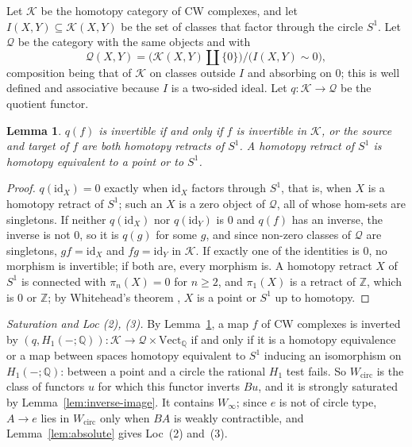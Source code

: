 \documentclass[11pt,a4paper]{article}
\newtheorem{lemma}[theorem]{Lemma}
\theoremstyle{definition}
\newcommand{\Winf}{W_{\infty}}
\newcommand{\Wcirc}{W_{\mathrm{circ}}}
\newcommand{\Z}{\mathbb{Z}}
\newcommand{\Q}{\mathbb{Q}}
\newcommand{\id}{\mathrm{id}}
\begin{document}
Let $\mathcal K$ be the homotopy category of CW complexes, and let $I(X,Y)\subseteq\mathcal
K(X,Y)$ be the set of classes that factor through the circle $S^1$. Let $\mathcal Q$ be the
category with the same objects and with
\[
\mathcal Q(X,Y)=\bigl(\mathcal K(X,Y)\amalg\{0\}\bigr)\big/\bigl(I(X,Y)\sim 0\bigr),
\]
composition being that of $\mathcal K$ on classes outside $I$ and absorbing on $0$; this is
well defined and associative because $I$ is a two-sided ideal. Let $q\colon\mathcal K\to\mathcal
Q$ be the quotient functor.

\begin{lemma}\label{lem:quotient}
$q(f)$ is invertible if and only if $f$ is invertible in $\mathcal K$, or the source and target
of $f$ are both homotopy retracts of $S^1$. A homotopy retract of $S^1$ is homotopy equivalent
to a point or to $S^1$.
\end{lemma}

\begin{proof}
$q(\id_X)=0$ exactly when $\id_X$ factors through $S^1$, that is, when $X$ is a homotopy
retract of $S^1$; such an $X$ is a zero object of $\mathcal Q$, all of whose hom-sets are
singletons. If neither $q(\id_X)$ nor $q(\id_Y)$ is $0$ and $q(f)$ has an inverse, the inverse is
not $0$, so it is $q(g)$ for some $g$, and since non-zero classes of $\mathcal Q$ are
singletons, $gf=\id_X$ and $fg=\id_Y$ in $\mathcal K$. If exactly one of the identities is $0$,
no morphism is invertible; if both are, every morphism is. A homotopy retract $X$ of $S^1$ is
connected with $\pi_n(X)=0$ for $n\ge2$, and $\pi_1(X)$ is a retract of $\Z$, which is $0$ or
$\Z$; by Whitehead's theorem \cite[Th.~4.5]{Hat02}, $X$ is a point or $S^1$ up to homotopy.
\end{proof}

\emph{Saturation and Loc (2), (3).} By Lemma~\ref{lem:quotient}, a map $f$ of CW complexes is
inverted by $(q,H_1(-;\Q))\colon\mathcal K\to\mathcal Q\times\mathrm{Vect}_{\Q}$ if and only
if it is a homotopy equivalence or a map between spaces homotopy equivalent to $S^1$ inducing
an isomorphism on $H_1(-;\Q)$: between a point and a circle the rational $H_1$ test fails. So
$\Wcirc$ is the class of functors $u$ for which this functor inverts $Bu$, and it is strongly
saturated by Lemma~\ref{lem:inverse-image}. It contains $\Winf$; since $e$ is not of circle
type, $A\to e$ lies in $\Wcirc$ only when $BA$ is weakly contractible, and
Lemma~\ref{lem:absolute} gives Loc~(2) and~(3).
\end{document}
